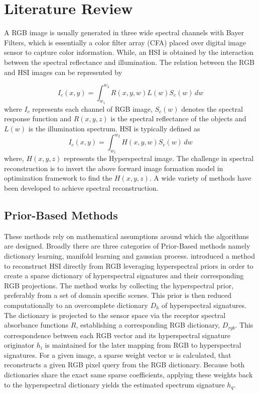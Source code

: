 \documentclass[stu]{apa7}
\begin{document}
\section{Literature Review}
A RGB image is usually generated in three wide spectral channels with Bayer Filters, which is essentially a color filter array (CFA) placed over digital image sensor to capture color information. While, an HSI is obtained by the interaction between the spectral reflectance and illumination. The relation between the RGB and HSI images can be represented by

\begin{equation}
    I_c(x, y) = \int_{w_1}^{w_2} R(x, y, w) L(w) S_c(w) \, dw
\end{equation}
where $I_c$ represents each channel of RGB image, $S_c(w)$ denotes the spectral response function and $R(x,y,z)$ is the spectral reflectance of the objects and $L(w)$ is the illumination spectrum. HSI is typically defined as
\begin{equation}
    I_c(x, y) = \int_{w_1}^{w_2} H(x, y, w) S_c(w) \, dw
\end{equation}
where, $H(x,y,z)$ represents the Hyperspectral image. The challenge in spectral reconstruction is to invert the above forward image formation model in optimization framework to find the $H(x, y, z)$. A wide variety of methods have been developed to achieve spectral reconstruction.

\subsection{Prior-Based Methods}
These methods rely on mathematical assumptions around which the algorithms are designed. Broadly there are three categories of Prior-Based methods namely dictionary learning, manifold learning and gaussian process. \textcite{Arad2016SparseRO} introduced a method to reconstruct HSI directly from RGB leveraging hyperspectral priors in order to create a sparse dictionary of hyperspectral signatures and their corresponding RGB projections. The method works by collecting the hyperspectral prior, preferably from a set of domain specific scenes. This prior is then reduced computationally to an overcomplete dictionary $D_h$ of hyperspectral signatures. The dictionary is projected to the sensor space via the receptor spectral absorbance functions $R$, establishing a corresponding RGB dictionary, $D_{rgb}$. 
This correspondence between each RGB vector and its hyperspectral signature originator $h_i$ is maintained for the later mapping from RGB to hyperspectral signatures. For a given image, a sparse weight vector $w$ is calculated, that reconstructs a given RGB pixel query from the RGB dictionary. Because both dictionaries share the exact same sparse coefficients, applying these weights back to the hyperspectral dictionary yields the estimated spectrum signature $h_q$. 
\end{document}
